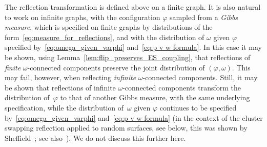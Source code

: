 \documentclass[english]{article}
\theoremstyle{plain}
\theoremstyle{plain}
\begin{document}
The reflection transformation is defined above on a finite graph. It is also natural to work on infinite graphs, with the configuration $\varphi$ sampled from a \emph{Gibbs measure}, which is specified on finite graphs by distributions of the form~\eqref{eq:measure_for_reflections}, and with the distribution of $\omega$ given $\varphi$ specified by~\eqref{eq:omega_given_varphi} and~\eqref{eq:p v w formula}. In this case it may be shown, using Lemma~\ref{lem:flip_preserves_ES_coupling}, that reflections of \emph{finite} $\omega$-connected components preserve the joint distribution of $(\varphi,\omega)$. This may fail, however, when reflecting \emph{infinite} $\omega$-connected components. Still, it may be shown that reflections of infinite $\omega$-connected components transform the distribution of~$\varphi$ to that of another Gibbs measure, with the same underlying specification, while the distribution of~$\omega$ given $\varphi$ continues to be specified by~\eqref{eq:omega_given_varphi} and~\eqref{eq:p v w formula} (in the context of the cluster swapping reflection applied to random surfaces, see below, this was shown by Sheffield~\cite{sheffield2005random}; see also~\cite[Lemma 4.2]{chandgotia2018delocalization}). We do not discuss this further here.
\end{document}
